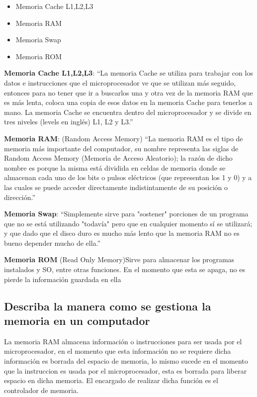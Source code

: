 \documentclass[12pt,letterpaper]{article}
\begin{document}
        \begin{itemize}
         \item Memoria Cache L1,L2,L3
         \item Memoria RAM
         \item Memoria Swap
         \item Memoria ROM
        \end{itemize}

        \textbf{Memoria Cache L1,L2,L3}: ``La memoria Cache se utiliza para trabajar con los datos e instrucciones que el microprocesador ve que se utilizan más seguido, entonces para no tener que ir a buscarlos una y otra vez de la memoria RAM que es más lenta, coloca una copia de esos datos en la memoria Cache para tenerlos a mano. La memoria Cache se encuentra dentro del microprocesador y se divide en tres niveles (levels en inglés) L1, L2 y L3.''\cite{GuiaProfesor} 

        \textbf{Memoria RAM}: (Random Access Memory) ``La memoria RAM es el tipo de memoria más importante del computador, su nombre representa las siglas de Random Access Memory (Memoria de Acceso Aleatorio); la razón de dicho nombre es porque la misma está dividida en celdas de memoria donde se almacenan cada uno de los bits o pulsos eléctricos (que representan los 1 y 0) y a las cuales se puede acceder directamente
        indistintamente de su posición o dirección.''\cite{GuiaProfesor}

        \textbf{Memoria Swap}: ``Simplemente sirve para "sostener" porciones de un programa que no se está utilizando "todavía" pero que en cualquier momento sí se utilizará; y que dado que el disco duro es mucho más lento que la memoria RAM no es bueno depender mucho de ella.''\cite{GuiaProfesor}

        \textbf{Memoria ROM} (Read Only Memory)Sirve para almacenar los programas instalados y SO, entre otras funciones. En el momento que esta se apaga, no es pierde la información guardada en ella

        
    \subsection{Describa la manera como se gestiona la memoria en un computador}
        La memoria RAM almacena información o instrucciones para ser usada por el microprocesador, en el momento que esta información no se requiere dicha información es borrada del espacio de memoria, lo mismo sucede en el momento que la instruccion es usada por el microprocesador, esta es borrada para liberar espacio en dicha memoria. El encargado de realizar dicha función es el controlador de memoria.       
\end{document}
